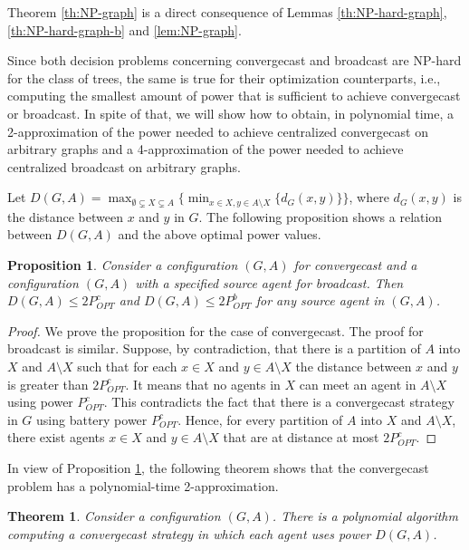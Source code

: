 \documentclass{article}
\newtheorem{theorem}{Theorem}
\newtheorem{proposition}{Proposition}
\newcommand\strat{\mbox{strategy}\xspace}
\newcommand\ccast{convergecast\xspace}
\newcommand\cccast{centralized convergecast\xspace}
\begin{document}
Theorem \ref{th:NP-graph} is a direct consequence of Lemmas \ref{th:NP-hard-graph}, \ref{th:NP-hard-graph-b} and \ref{lem:NP-graph}.

Since both decision problems concerning convergecast and broadcast are NP-hard for the class of trees, the same is true for their optimization counterparts, i.e., computing the smallest amount of power that is sufficient to achieve convergecast or broadcast.
In spite of that, we will show how to obtain, in polynomial time, a 2-approximation of the power needed to achieve {\cccast} on arbitrary graphs and a 4-approximation of the power needed to achieve centralized broadcast on arbitrary graphs. 

Let $D(G,A)=\max_{\emptyset\subsetneq X \subsetneq A}\{ \min_{x\in X, y\in A\setminus X}\{d_G(x,y)\}\}$, where $d_G(x,y)$ is the distance between $x$ and $y$ in $G$. The following proposition shows a relation between $D(G,A)$ and the above optimal power values.

\begin{proposition}\label{lem:twice-p}
Consider a configuration $(G,A)$ for convergecast and a configuration $(G,A)$ with a specified source agent for broadcast. Then $D(G,A)\leq 2P_{OPT}^c$ and $D(G,A)\leq 2P_{OPT}^b$ for any source agent in $(G,A)$.
\end{proposition}

\begin{proof}
We prove the proposition for the case of convergecast. The proof for broadcast is similar.
Suppose, by contradiction, that there is a partition of $A$ into $X$ and $A\setminus X$ such that for each $x\in X$ and $y\in A\setminus X$ the distance between $x$ and $y$ is greater than $2P_{OPT}^c$. It means that no agents in $X$ can meet an agent in $A\setminus X$ using power $P_{OPT}^c$. This contradicts the fact that there is a {\ccast} {\strat} in $G$ using battery power $P_{OPT}^c$. Hence, for every partition of $A$ into $X$ and $A\setminus X$, there exist agents $x\in X$ and $y\in A\setminus X$ that are at distance at most $2P_{OPT}^c$.
\end{proof}

In view of Proposition \ref{lem:twice-p}, the following theorem shows that the convergecast problem has a polynomial-time 2-approximation.

\begin{theorem}\label{cor:FourApr}
Consider a configuration $(G,A)$. There is a polynomial algorithm computing a {\ccast} strategy in which each agent uses power $D(G,A)$.
\end{theorem}
\end{document}
